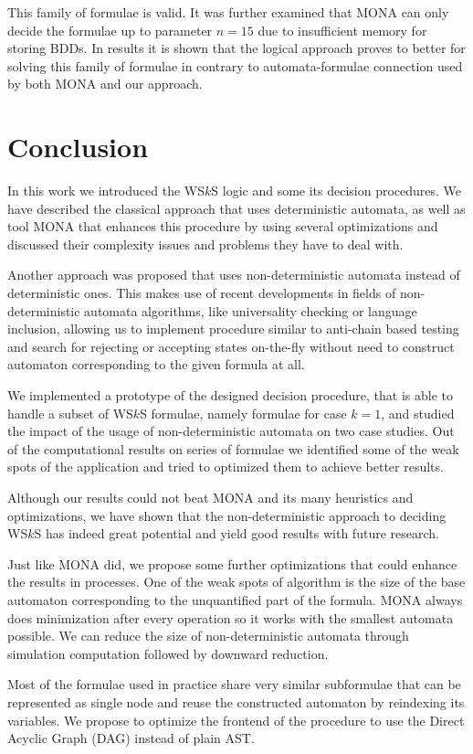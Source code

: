 This family of formulae is valid. It was further examined that \textsc{MONA} can
only decide the formulae up to parameter $n = 15$ due to insufficient memory for
storing BDDs. In results it is shown that the logical approach \cite{mso} proves
to better for solving this family of formulae in contrary to automata-formulae
connection used by both \textsc{MONA} and our approach.
\fi

\chapter{Conclusion}\label{summary}

In this work we introduced the WS$k$S logic and some its decision procedures. We
have described the classical approach that uses deterministic automata, as well
as tool \textsc{MONA} that enhances this procedure by using several optimizations and
discussed their complexity issues and problems they have to deal with.

Another approach was proposed that uses non-deterministic automata instead of
deterministic ones. This makes use of recent developments in fields of
non-deterministic automata algorithms, like universality checking or language
inclusion, allowing us to implement procedure similar to anti-chain based
testing \cite{tacas} and search for rejecting or accepting states on-the-fly
without need to construct automaton corresponding to the given formula at all.

We implemented a prototype of the designed decision procedure, that is able to
handle a subset of WS$k$S formulae, namely formulae for case $k = 1$, and
studied the impact of the usage of non-deterministic automata on two case
studies. Out of the computational results on series of formulae we identified
some of the weak spots of the application and tried to optimized them to achieve
better results.

Although our results could not beat \textsc{MONA} and its many heuristics and
optimizations, we have shown that the non-deterministic approach to deciding
WS$k$S has indeed great potential and yield good results with future research.

Just like \textsc{MONA} did, we propose some further optimizations that could
enhance the results in processes. One of the weak spots of algorithm is the size
of the base automaton corresponding to the unquantified part of the formula.
\textsc{MONA} always does minimization after every operation so it works with
the smallest automata possible. We can reduce the size of non-deterministic
automata through simulation computation followed by downward reduction. 

Most of the formulae used in practice share very similar subformulae that can be
represented as single node and reuse the constructed automaton by reindexing its
variables. We propose to optimize the frontend of the procedure to use the
Direct Acyclic Graph (DAG) instead of plain AST. 

